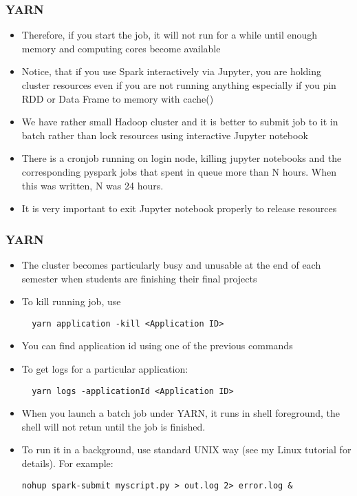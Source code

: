 \documentclass{beamer}
\begin{document}
\begin{frame}[fragile]
  \frametitle{YARN}
  \begin{itemize}
  \item Therefore, if you start the job, it will not run for a while until enough memory and computing cores become available
  \item Notice, that if you use Spark interactively via Jupyter, you are holding cluster resources even if you are not running anything
    especially if you pin RDD or Data Frame to memory with {\color{mycolorcode}cache()}
  \item We have rather small Hadoop cluster and it is better to submit job to it in batch rather than lock resources using
    interactive Jupyter notebook
  \item There is a cronjob running on login node, killing jupyter notebooks and the corresponding pyspark jobs that spent in queue more
    than N hours. When this was written, N was 24 hours.
  \item It is very important to exit Jupyter notebook properly to release resources
  \end{itemize}
\end{frame}


\begin{frame}[fragile]
  \frametitle{YARN}
  \begin{itemize}
  \item The cluster becomes particularly busy and unusable at the end of each semester when students are finishing their final projects
  \item To kill running job, use
    {\color{mycolorcli}
\begin{verbatim}
  yarn application -kill <Application ID>
\end{verbatim}
    }
  \item You can find application id using one of the previous commands
  \item To get logs for a particular application:
    {\color{mycolorcli}
\begin{verbatim}
  yarn logs -applicationId <Application ID>
\end{verbatim}
    }
  \item When you launch a batch job under YARN, it runs in shell foreground, the shell will not retun until the job is finished.
  \item To run it in a background, use standard UNIX way (see my Linux tutorial for details). For example:
    {\color{mycolorcli}
\begin{verbatim}
nohup spark-submit myscript.py > out.log 2> error.log &
\end{verbatim}        
} 
  \end{itemize}
\end{frame}
\end{document}
